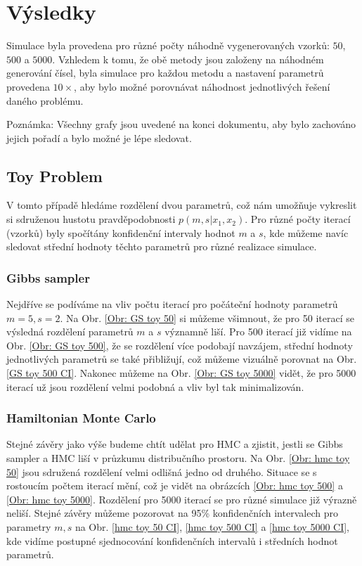 \documentclass[11pt,oneside,american,czech]{article}
\begin{document}
\section{Výsledky}

Simulace byla provedena pro různé počty náhodně vygenerovaných vzorků: $50$, $500$ a $5000$. Vzhledem k tomu, že obě metody jsou založeny na náhodném generování čísel, byla simulace pro každou metodu a nastavení parametrů provedena $10\times$, aby bylo možné porovnávat náhodnost jednotlivých řešení daného problému.

Poznámka: Všechny grafy jsou uvedené na konci dokumentu, aby bylo zachováno jejich pořadí a bylo možné je lépe sledovat.

\subsection{Toy Problem}

V tomto případě hledáme rozdělení dvou parametrů, což nám umožňuje vykreslit si sdruženou hustotu pravděpodobnosti $p(m,s|x_1,x_2)$. Pro různé počty iterací (vzorků) byly spočítány konfidenční intervaly hodnot $m$ a $s$, kde můžeme navíc sledovat střední hodnoty těchto parametrů pro různé realizace simulace.

\subsubsection{Gibbs sampler}

Nejdříve se podíváme na vliv počtu iterací pro počáteční hodnoty parametrů $m = 5, s = 2$. Na Obr. \ref{Obr: GS toy 50} si můžeme všimnout, že pro 50 iterací se výsledná rozdělení parametrů $m$ a $s$ významně liší. Pro 500 iterací již vidíme na Obr. \ref{Obr: GS toy 500}, že se rozdělení více podobají navzájem, střední hodnoty jednotlivých parametrů se také přibližují, což můžeme vizuálně porovnat na Obr. \ref{GS toy 500 CI}. Nakonec můžeme na Obr. \ref{Obr: GS toy 5000} vidět, že pro 5000 iterací už jsou rozdělení velmi podobná a vliv  byl tak minimalizován.

\subsubsection{Hamiltonian Monte Carlo}

Stejné závěry jako výše budeme chtít udělat pro HMC a zjistit, jestli se Gibbs sampler a HMC liší v průzkumu distribučního prostoru. Na Obr. \ref{Obr: hmc toy 50} jsou sdružená rozdělení velmi odlišná jedno od druhého. Situace se s rostoucím počtem iterací mění, což je vidět na obrázcích \ref{Obr: hmc toy 500} a \ref{Obr: hmc toy 5000}. Rozdělení pro 5000 iterací se pro různé simulace již výrazně neliší. Stejné závěry můžeme pozorovat na 95\% konfidenčních intervalech pro parametry $m, s$ na Obr. \ref{hmc toy 50 CI}, \ref{hmc toy 500 CI}  a \ref{hmc toy 5000 CI}, kde vidíme postupné sjednocování konfidenčních intervalů i středních hodnot parametrů.
\end{document}
